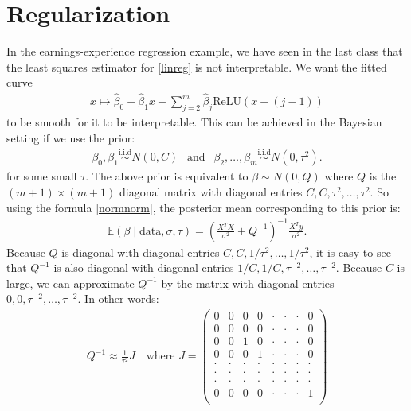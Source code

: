 \documentclass{scrartcl}
\newcommand{\E}{{\mathbb E}}
\newcommand{\relu}{{\text{ReLU}}}
\begin{document}
\section{Regularization}
In the earnings-experience regression example, we have seen in the
last class that the least squares estimator for \eqref{linreg} is not
interpretable. We want the fitted curve
\begin{align*}
  x \mapsto \hat{\beta}_0 + \hat{\beta}_1 x + \sum_{j=2}^m
  \hat{\beta}_j \relu(x - (j-1))
\end{align*}
to be smooth for it to be interpretable. This can be achieved in the
Bayesian setting if we use the prior: 
\begin{align}\label{regu_prior}
  \beta_0, \beta_1 \overset{\text{i.i.d}}{\sim} N(0, C) ~~ \text{ and
  } ~~ \beta_2, \dots, \beta_{m} \overset{\text{i.i.d}}{\sim} N(0,
  \tau^2). 
\end{align}
for some small $\tau$. The above prior
is equivalent to $\beta \sim N(0, Q)$ where $Q$ is the $(m+1) \times
(m+1)$ diagonal matrix with diagonal entries $C, C, \tau^2, \dots,
\tau^2$. So using the formula \eqref{normnorm}, the posterior mean
corresponding to this prior is:
\begin{align*}
  \E \left(\beta \mid \text{data}, \sigma, \tau \right) =
  \left(\frac{X^T X}{\sigma^2} + Q^{-1} \right)^{-1} \frac{X^T
  y}{\sigma^2}. 
\end{align*}
Because $Q$ is diagonal with diagonal entries $C, C, 1/\tau^2, \dots,
1/\tau^2$, it is easy to see that $Q^{-1}$ is also diagonal with
diagonal entries $1/C, 1/C, \tau^{-2}, \dots, \tau^{-2}$. Because $C$
is large, we can approximate $Q^{-1}$ by the matrix with diagonal
entries $0, 0, \tau^{-2}, \dots, \tau^{-2}$. In other words:
\begin{align*}
   Q^{-1} \approx \frac{1}{\tau^2} J ~~~ \text{ where } J = \begin{pmatrix}
      0 & 0 & 0 & 0 & \cdot & \cdot & \cdot & 0 \\
      0 & 0 & 0 & 0 & \cdot & \cdot & \cdot & 0 \\
      0 & 0 & 1 & 0 &\cdot & \cdot & \cdot & 0 \\
      0 & 0 & 0 & 1 & \cdot & \cdot & \cdot & 0 \\
      \cdot & \cdot & \cdot & \cdot & \cdot & \cdot & \cdot & \cdot \\
      \cdot & \cdot & \cdot & \cdot & \cdot & \cdot & \cdot & \cdot \\
      \cdot & \cdot & \cdot & \cdot & \cdot & \cdot & \cdot & \cdot \\
      0 & 0 & 0 & 0 & \cdot & \cdot & \cdot & 1 \\
\end{pmatrix}  
\end{align*}
\end{document}

